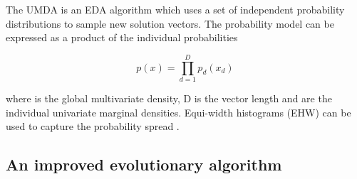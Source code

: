 The UMDA is an EDA algorithm which uses a set of independent probability distributions to sample new solution vectors. The probability model can be expressed as a product of the individual probabilities

\begin{equation}
  p(x) = \prod _{d=1}^D {p_d(x_d)}
\end{equation}

where  is the global multivariate density, D is the vector length and  are the individual univariate marginal densities. Equi-width histograms (EHW) can be used to capture the probability spread \cite{povsik2004estimation}.


\subsection{An improved evolutionary algorithm}
